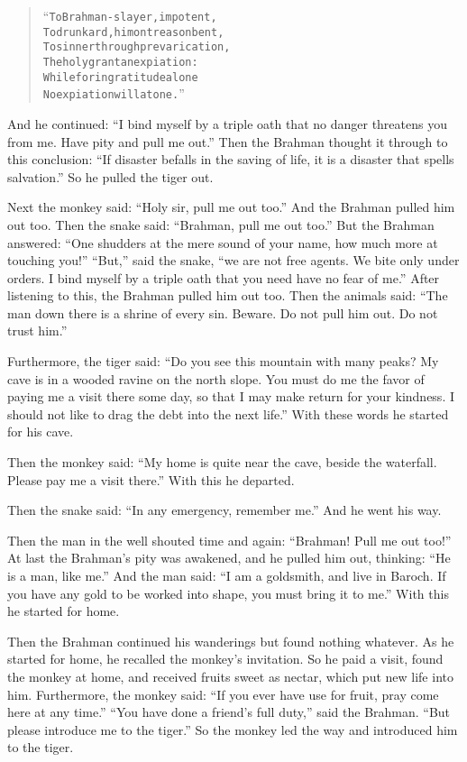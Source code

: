 \documentclass[article, twoside, 14pt]{memoir}
\renewenvironment{verbatim}{%
\begin{quote}%
\vskip -10pt%
\begin{alltt}\normalfont\large}{\end{alltt}%
\end{quote}%
\vskip -10pt
} %
\begin{document}
\begin{verbatim}
“To Brahman-slayer, impotent,
To drunkard, him on treason bent,
To sinner through prevarication,
The holy grant an expiation:
While for ingratitude alone
No expiation will atone.”
\end{verbatim}
And he continued:
``I bind myself by a triple oath that no danger threatens you from me. Have pity and pull me out.''
Then the Brahman thought it through to this conclusion:
``If disaster befalls in the saving of life, it is a disaster that spells salvation.''
So he pulled the tiger out.

Next the monkey said: ``Holy sir, pull me out too.'' And the
Brahman pulled him out too. Then the snake said:
``Brahman, pull me out too.'' But the Brahman answered:
``One shudders at the mere sound of your name, how much more at touching you!''
``But,'' said the snake,
``we are not free agents. We bite only under orders. I bind myself by a triple oath that you need have no fear of me.''
After listening to this, the Brahman pulled him out too. Then the
animals said:
``The man down there is a shrine of every sin. Beware. Do not pull him out. Do not trust him.''

Furthermore, the tiger said:
``Do you see this mountain with many peaks? My cave is in a wooded ravine on the north slope. You must do me the favor of paying me a visit there some day, so that I may make return for your kindness. I should not like to drag the debt into the next life.''
With these words he started for his cave.

Then the monkey said:
``My home is quite near the cave, beside the waterfall. Please pay me a visit there.''
With this he departed.

Then the snake said: ``In any emergency, remember me.'' And he went
his way.

Then the man in the well shouted time and again:
``Brahman! Pull me out too!'' At last the Brahman's pity was
awakened, and he pulled him out, thinking:
``He is a man, like me.'' And the man said:
``I am a goldsmith, and live in Baroch. If you have any gold to be worked into shape, you must bring it to me.''
With this he started for home.

Then the Brahman continued his wanderings but found nothing
whatever. As he started for home, he recalled the monkey's
invitation. So he paid a visit, found the monkey at home, and
received fruits sweet as nectar, which put new life into him.
Furthermore, the monkey said:
``If you ever have use for fruit, pray come here at any time.''
``You have done a friend's full duty,'' said the Brahman.
``But please introduce me to the tiger.'' So the monkey led the way
and introduced him to the tiger.
\end{document}
